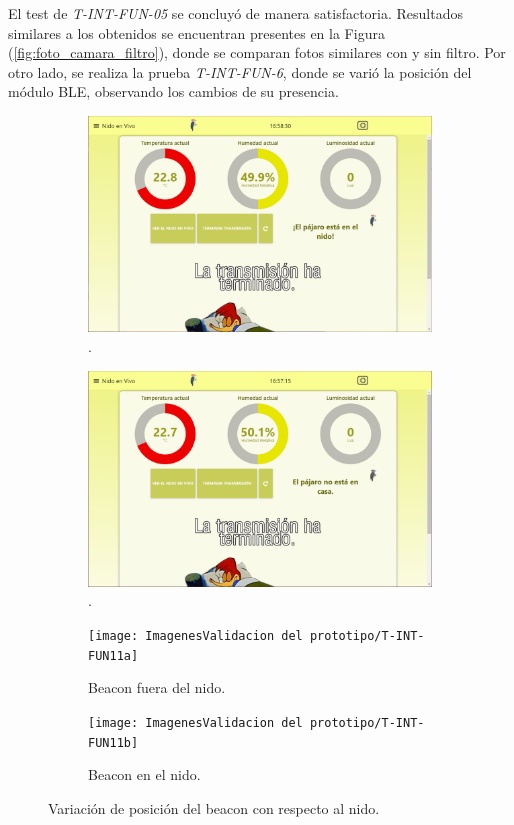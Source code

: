El test de \textit{T-INT-FUN-05} se concluyó de manera satisfactoria. Resultados similares a los obtenidos se encuentran presentes en la Figura (\ref{fig:foto_camara_filtro}), donde se comparan fotos similares con y sin filtro. Por otro lado, se realiza la prueba \textit{T-INT-FUN-6}, donde se varió la posición del módulo BLE, observando los cambios de su presencia.
\begin{figure}[H]
	\centering
		\begin{subfigure}{0.49\textwidth}
			\centering
			\includegraphics[width=\linewidth]{ImagenesValidacion del prototipo/T-INT-FUN-6-1}		
			\caption{.}
		\end{subfigure}\hfill
		\begin{subfigure}{0.49\textwidth}
			\centering
			\includegraphics[width=\linewidth]{ImagenesValidacion del prototipo/T-INT-FUN-6-2}
			\caption{.}
		\end{subfigure}		
		
		\begin{subfigure}{0.49\textwidth}
			\centering
			\texttt{[image: ImagenesValidacion del prototipo/T-INT-FUN11a]}	
			\caption{Beacon fuera del nido.}
		\end{subfigure}\hfill
		\begin{subfigure}{0.49\textwidth}
			\centering
			\texttt{[image: ImagenesValidacion del prototipo/T-INT-FUN11b]}
		\caption{Beacon en el nido.}
		\end{subfigure}
	\caption{Variación de posición del beacon con respecto al nido.}
\end{figure}

